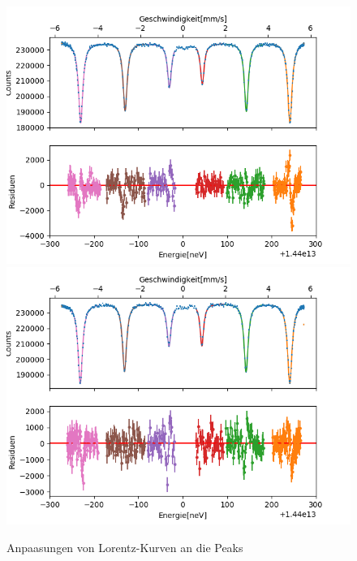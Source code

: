 \documentclass[12pt,a4paper]{article}
\begin{document}
\begin{figure}
\centering
\includegraphics[scale=0.9]{Bilder/Hyperfein/Hyper_fit_vor.png}
\includegraphics[scale=0.9]{Bilder/Hyperfein/Hyper_fit_nach.png}
\caption{Anpaasungen von Lorentz-Kurven an die Peaks}
\label{fig:Hyper_fit}
\end{figure}
\end{document}
